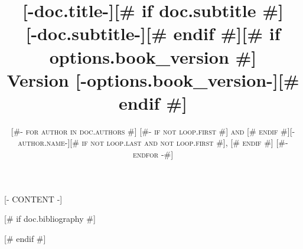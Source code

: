 \documentclass[a4paper,11pt,oneside]{book}
\title{\Huge \textbf{[-doc.title-]}[# if doc.subtitle #] \\ \huge [-doc.subtitle-][# endif #][# if options.book_version #] \\[1em] \large Version [-options.book_version-][# endif #]}
\author{\textsc{
[#- for author in doc.authors #]
  [#- if not loop.first #] and [# endif #][-author.name-][# if not loop.last and not loop.first #], [# endif #]
[#- endfor -#]
}}
\begin{document}
\sloppy

\frontmatter
\makeatletter
\@mainmattertrue
\renewcommand{\thechapter}{\Roman{chapter}}
\renewcommand\@makechapterhead[1]{%
  \vspace*{50\p@}%
  {\parindent\z@ \raggedright \normalfont
    \huge\bfseries \thechapter.\space #1\par\nobreak
    \vskip 40\p@}}
\makeatother
\setcounter{secnumdepth}{0}
\maketitle

{\hypersetup{linkcolor=black}\tableofcontents}

[- CONTENT -]


[# if doc.bibliography #]

[# endif #]
\end{document}
